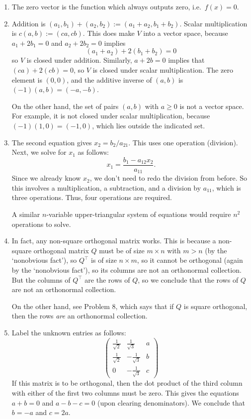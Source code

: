 \documentclass[10pt]{amsart}
\theoremstyle{mythm}
\theoremstyle{definition}
\theoremstyle{myrmk}
\begin{document}
	\begin{enumerate}
		\item The zero vector is the function which always outputs zero, i.e.\ $f(x) = 0$. 
		\item Addition is $(a_1, b_1) + (a_2, b_2) := (a_1+a_2, b_1+b_2)$. Scalar multiplication is $c(a, b) := (ca, cb)$. This does make $V$ into a vector space, because $a_1 + 2b_1 = 0$ and $a_2 + 2b_2 = 0$ implies 
		\[
			(a_1 + a_2) + 2(b_1 + b_2) = 0
		\]
		so $V$ is closed under addition. Similarly, $a + 2b = 0$ implies that $(ca) + 2(cb) = 0$, so $V$ is closed under scalar multiplication. The zero element is $(0, 0)$, and the additive inverse of $(a,b)$ is $(-1)(a,b) = (-a, -b)$. 
		
		On the other hand, the set of pairs $(a, b)$ with $a \ge 0$ is not a vector space. For example, it is not closed under scalar multiplication, because $(-1) (1, 0) = (-1, 0)$, which lies outside the indicated set. 
		\item The second equation gives $x_2 = b_2 / a_{21}$. This uses one operation (division). Next, we solve for $x_1$ as follows: 
		\[
			x_1 = \frac{b_1 - a_{12} x_2}{a_{11}}. 
		\]
		Since we already know $x_2$, we don't need to redo the division from before. So this involves a multiplication, a subtraction, and a division by $a_{11}$, which is three operations. Thus, four operations are required. 
		
		A similar $n$-variable upper-triangular system of equations would require $n^2$ operations to solve. 
		\item In fact, any non-square orthogonal matrix works. This is because a non-square orthogonal matrix $Q$ must be of size $m \times n$ with $m > n$ (by the `nonobvious fact'), so $Q^\top$ is of size $n \times m$, so it cannot be orthogonal (again by the `nonobvious fact'), so its columns are not an orthonormal collection. But the columns of $Q^\top$ are the rows of $Q$, so we conclude that the rows of $Q$ are not an orthonormal collection. 
		
		On the other hand, see Problem 8, which says that if $Q$ is square orthogonal, then the rows \emph{are} an orthonormal collection. 
		\item Label the unknown entries as follows: 
		\[
		\begin{pmatrix}
			\frac{1}{\sqrt{2}} & \frac{1}{\sqrt{3}} & a \\
			\frac{1}{\sqrt{2}} & -\frac{1}{\sqrt{3}} & b \\
			0 & -\frac{1}{\sqrt{3}} & c
		\end{pmatrix}
		\]
		If this matrix is to be orthogonal, then the dot product of the third column with either of the first two columns must be zero. This gives the equations $a + b = 0$ and $a - b - c = 0$ (upon clearing denominators). We conclude that $b = -a$ and $c = 2a$. 
		

\end{enumerate}
\end{document}
